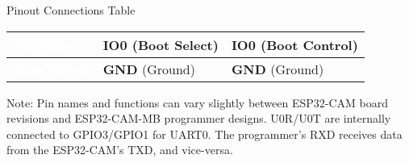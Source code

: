 \documentclass{beamer}
\begin{document}
\begin{frame}{Pinout Connections Table}
\begin{tabularx}{\textwidth}{|>{\centering\arraybackslash}p{2.2cm}|X|X|}
    \hline
    \rowcolor{wireMagenta!70} \textcolor{white}{\bf Magenta} & \textbf{IO0} \newline (Boot Select) & \textbf{IO0} \newline (Boot Control) \\
    \hline
    \rowcolor{wireDarkGreen!70} \textcolor{white}{\bf Dark Green} & \textbf{GND} \newline (Ground) & \textbf{GND} \newline (Ground) \\
    \hline
  \end{tabularx}
  \vfill
  \tiny Note: Pin names and functions can vary slightly between ESP32-CAM board revisions and ESP32-CAM-MB programmer designs. U0R/U0T are internally connected to GPIO3/GPIO1 for UART0. The programmer's RXD receives data from the ESP32-CAM's TXD, and vice-versa.
\end{frame}
\end{document}

